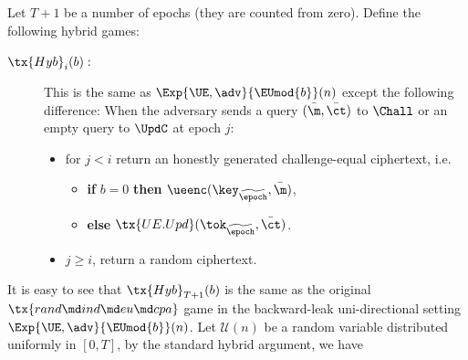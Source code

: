 \documentclass{fundam}
\begin{document}
Let $T+1$ be a number of epochs (they are counted from zero). Define the following hybrid games: 
\begin{description}
	\item[$\tx{Hyb}_{i}(b):$] This is the same as $\Exp{\UE,\adv}{\EUmod{b}}(n)$ except the following difference: When the adversary sends a query $(\bar{\m}, \bar{\ct})$ to $\Chall$ or an empty query to $\UpdC$ at epoch $j$:
	\begin{itemize}
		\item for $j<i$ return an honestly generated challenge-equal ciphertext, i.e. 
		\begin{itemize}
			\item[{}] \textbf{if} $b=0$ \textbf{then} $\ueenc(\key_{\widetilde{\epoch}}, \bar{\m})$,
			\item[{}] \textbf{else} $\tx{UE.Upd}(\tok_{\widetilde{\epoch}}, \bar{\ct})$. 
		\end{itemize}
		\item $j\geq i$, return a random ciphertext.
	\end{itemize}
\end{description}
It is easy to see that $\tx{Hyb}_{T+1}(b)$ is the same as the original $\tx{rand\md ind\md eu\md cpa}$	game in the backward-leak uni-directional setting $\Exp{\UE,\adv}{\EUmod{b}}(n)$. Let $\mathcal{U} (n)$ be a random variable distributed uniformly in $[0,T]$, by the standard hybrid argument, we have
\end{document}

